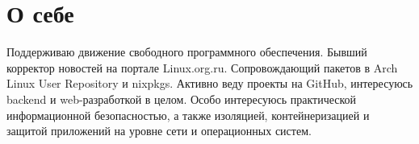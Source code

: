 \section{О себе}
Поддерживаю движение свободного программного обеспечения. Бывший корректор новостей на
портале Linux.org.ru. Сопровождающий пакетов в Arch Linux User Repository и nixpkgs.
Активно веду проекты на GitHub, интересуюсь backend и web-разработкой в целом. Особо
интересуюсь практической информационной безопасностью, а также изоляцией, контейнеризацией
и защитой приложений на уровне сети и операционных систем.
